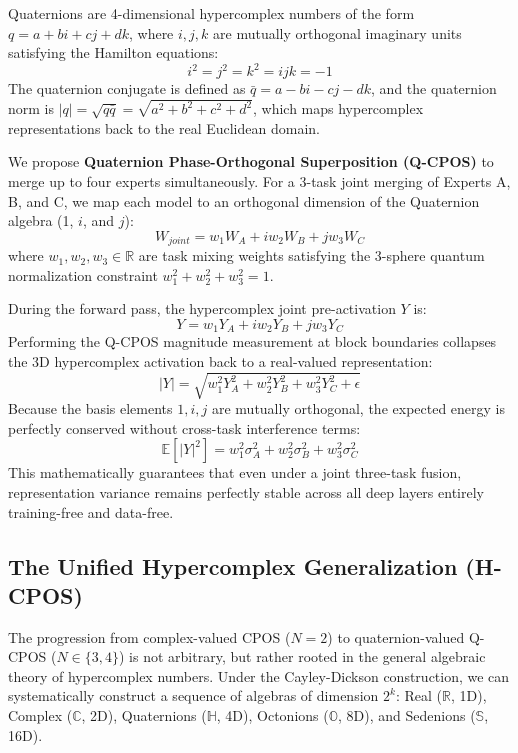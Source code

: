 \documentclass{article}
\theoremstyle{plain}
\theoremstyle{definition}
\theoremstyle{remark}
\begin{document}
Quaternions are 4-dimensional hypercomplex numbers of the form $q = a + b i + c j + d k$, where $i, j, k$ are mutually orthogonal imaginary units satisfying the Hamilton equations:
\begin{equation}
i^2 = j^2 = k^2 = ijk = -1
\end{equation}
The quaternion conjugate is defined as $\bar{q} = a - b i - c j - d k$, and the quaternion norm is $|q| = \sqrt{q \bar{q}} = \sqrt{a^2 + b^2 + c^2 + d^2}$, which maps hypercomplex representations back to the real Euclidean domain.

We propose \textbf{Quaternion Phase-Orthogonal Superposition (Q-CPOS)} to merge up to four experts simultaneously. For a 3-task joint merging of Experts A, B, and C, we map each model to an orthogonal dimension of the Quaternion algebra (1, $i$, and $j$):
\begin{equation}
W_{joint} = w_1 W_A + i w_2 W_B + j w_3 W_C
\end{equation}
where $w_1, w_2, w_3 \in \mathbb{R}$ are task mixing weights satisfying the 3-sphere quantum normalization constraint $w_1^2 + w_2^2 + w_3^2 = 1$.

During the forward pass, the hypercomplex joint pre-activation $Y$ is:
\begin{equation}
Y = w_1 Y_A + i w_2 Y_B + j w_3 Y_C
\end{equation}
Performing the Q-CPOS magnitude measurement at block boundaries collapses the 3D hypercomplex activation back to a real-valued representation:
\begin{equation}
|Y| = \sqrt{w_1^2 Y_A^2 + w_2^2 Y_B^2 + w_3^2 Y_C^2 + \epsilon}
\end{equation}
Because the basis elements $1, i, j$ are mutually orthogonal, the expected energy is perfectly conserved without cross-task interference terms:
\begin{equation}
\mathbb{E}[|Y|^2] = w_1^2 \sigma_A^2 + w_2^2 \sigma_B^2 + w_3^2 \sigma_C^2
\end{equation}
This mathematically guarantees that even under a joint three-task fusion, representation variance remains perfectly stable across all deep layers entirely training-free and data-free.

\subsection{The Unified Hypercomplex Generalization (H-CPOS)}
\label{subsec:hcpos}
The progression from complex-valued CPOS ($N=2$) to quaternion-valued Q-CPOS ($N \in \{3,4\}$) is not arbitrary, but rather rooted in the general algebraic theory of hypercomplex numbers. Under the Cayley-Dickson construction, we can systematically construct a sequence of algebras of dimension $2^k$: Real ($\mathbb{R}$, 1D), Complex ($\mathbb{C}$, 2D), Quaternions ($\mathbb{H}$, 4D), Octonions ($\mathbb{O}$, 8D), and Sedenions ($\mathbb{S}$, 16D).
\end{document}
